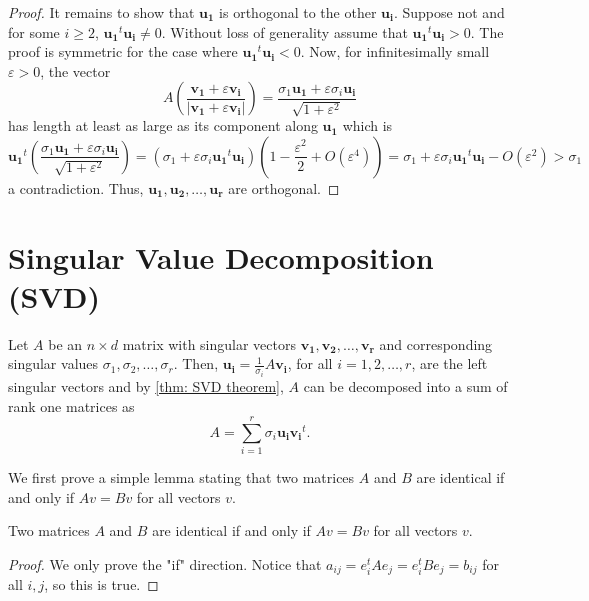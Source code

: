 \begin{proof}
  It remains to show that \(\mathbf{u_1} \) is orthogonal to the other \(\mathbf{u_i} \). Suppose not and for some \(i \geq 2\), \(\mathbf{u_1}^t \mathbf{u_i} \neq 0  \). Without loss of generality assume that \(\mathbf{u_1}^t \mathbf{u_i}>0\). The proof is symmetric for the case where \(\mathbf{u_1}^t \mathbf{u_i} < 0\). Now, for infinitesimally small \(\varepsilon >0\), the vector 
  \[
    A \left( \frac{\mathbf{v_1} + \varepsilon  \mathbf{v_i}  }{\vert \mathbf{v_1} + \varepsilon  \mathbf{v_i} \vert } \right) = \frac{\sigma _1 \mathbf{u_1} + \varepsilon \sigma _i \mathbf{u_i}  }{\sqrt{1+\varepsilon ^2} }
  \]      
  has length at least as large as its component along \(\mathbf{u_1} \) which is 
  \[
    \mathbf{u_1}^t \left( \frac{\sigma _1 \mathbf{u_1} + \varepsilon  \sigma _i \mathbf{u_i} }{\sqrt{1+\varepsilon ^2} } \right)=\left( \sigma _1+\varepsilon \sigma _i \mathbf{u_1}^t \mathbf{u_i}  \right) \left( 1-\frac{\varepsilon ^2}{2} + O\left( \varepsilon ^4 \right)  \right) = \sigma _1 + \varepsilon \sigma _i \mathbf{u_1}^t \mathbf{u_i}  - O\left( \varepsilon ^ 2\right) > \sigma _1  
  \] a contradiction. Thus, \(\mathbf{u_1}, \mathbf{u_2}, \dots , \mathbf{u_r}   \) are orthogonal. 
\end{proof}

\section{Singular Value Decomposition (SVD)}

Let \(A\) be an \(n \times d\) matrix with singular vectors \(\mathbf{v_1}, \mathbf{v_2}, \dots , \mathbf{v_r} \) and corresponding singular values \(\sigma _1, \sigma _2, \dots , \sigma _r\). Then, \(\mathbf{u_i} = \frac{1}{\sigma _i}A \mathbf{v_i}  \), for all \(i=1,2,\dots ,r\), are the left singular vectors and by \autoref{thm: SVD theorem}, \(A\) can be decomposed into a sum of rank one matrices as 
\[
  A=\sum_{i=1}^{r} \sigma _i \mathbf{u_i} \mathbf{v_i}^t .  
\]      

We first prove a simple lemma stating that two matrices \(A\) and \(B\) are identical if and only if \(Av=Bv\) for all vectors \(v\).

\begin{lemma} \label{lm: identical matrices}
 Two matrices \(A\) and \(B\) are identical if and only if \(Av=Bv\) for all vectors \(v\). 
\end{lemma}
\begin{proof}
  We only prove the "if" direction. Notice that \(a_{ij} = e_i^t A e_j = e_i^t B e_j = b_{ij}\) for all \(i,j\), so this is true.
\end{proof}

